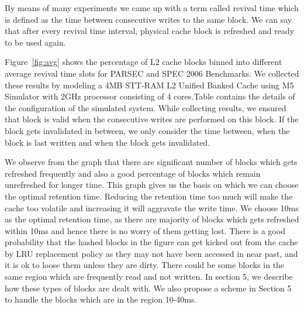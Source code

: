 By means of many experiments we came up with a term called revival time which is defined as  the time between consecutive writes to the same block. We can say that after every revival time interval, physical cache block is refreshed and ready to be used again.

Figure~\ref{fig:avg}  shows the percentage of L2 cache blocks binned into different average revival time slots for PARSEC and SPEC 2006 Benchmarks. We collected these results by modeling a 4MB STT-RAM L2 Unified Banked Cache using M5 Simulator with 2GHz processor consisting of 4 cores.Table contains the details of the configuration of the simulated system. While collecting results, we ensured that block is valid when the consecutive writes are performed on this block. If the block gets invalidated in between, we only consider the time between, when the block is last written and when the block gets invalidated.

We observe from the graph that there are significant number of blocks which gets refreshed frequently and also a good percentage of blocks which remain unrefreshed for longer time. This graph gives us the basis on which we can choose the optimal retention time. Reducing the retention time too much will make the cache too volatile and increasing it will aggravate the write time.  We choose 10ms as the optimal retention time, as there are majority of blocks which gets refreshed within 10ms and hence there is no worry of them getting lost. There is a good probability that the hashed blocks in the figure can get kicked out from the cache by LRU replacement policy as they may not have been accessed in near past, and it is ok to loose them unless they are dirty. There could be some blocks in the same region which are frequently read and not written. In section 5, we describe how these types of blocks are dealt with. We also propose a scheme in Section 5 to handle the blocks which are in the region 10-40ms.










